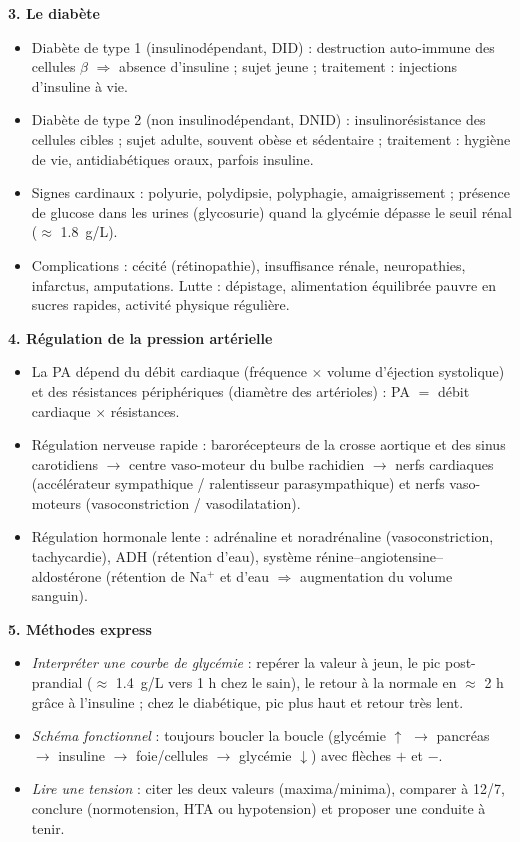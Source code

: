 \documentclass[11pt]{article}
\newcommand{\cle}[1]{{\popxbold\color{popdark}#1}}
\begin{document}
\begin{bilan}
\textbf{3. Le diabète}
\begin{itemize}
  \item \cle{Diabète de type 1} (insulinodépendant, DID) : destruction auto-immune des cellules $\beta$ $\Rightarrow$ absence d'insuline ; sujet jeune ; traitement : injections d'insuline à vie.
  \item \cle{Diabète de type 2} (non insulinodépendant, DNID) : \cle{insulinorésistance} des cellules cibles ; sujet adulte, souvent obèse et sédentaire ; traitement : hygiène de vie, antidiabétiques oraux, parfois insuline.
  \item Signes cardinaux : \cle{polyurie}, \cle{polydipsie}, \cle{polyphagie}, amaigrissement ; présence de glucose dans les urines (\cle{glycosurie}) quand la glycémie dépasse le seuil rénal ($\approx$ \SI{1,8}{g/L}).
  \item Complications : cécité (rétinopathie), insuffisance rénale, neuropathies, infarctus, amputations. Lutte : dépistage, alimentation équilibrée pauvre en sucres rapides, activité physique régulière.
\end{itemize}

\textbf{4. Régulation de la pression artérielle}
\begin{itemize}
  \item La PA dépend du \cle{débit cardiaque} (fréquence $\times$ volume d'éjection systolique) et des \cle{résistances périphériques} (diamètre des artérioles) : PA $=$ débit cardiaque $\times$ résistances.
  \item \cle{Régulation nerveuse rapide} : barorécepteurs de la crosse aortique et des sinus carotidiens $\rightarrow$ centre vaso-moteur du bulbe rachidien $\rightarrow$ nerfs cardiaques (accélérateur sympathique / ralentisseur parasympathique) et nerfs vaso-moteurs (vasoconstriction / vasodilatation).
  \item \cle{Régulation hormonale lente} : adrénaline et noradrénaline (vasoconstriction, tachycardie), ADH (rétention d'eau), système rénine--angiotensine--aldostérone (rétention de Na$^+$ et d'eau $\Rightarrow$ augmentation du volume sanguin).
\end{itemize}

\textbf{5. Méthodes express}
\begin{itemize}
  \item \emph{Interpréter une courbe de glycémie} : repérer la valeur à jeun, le pic post-prandial ($\approx$ \SI{1,4}{g/L} vers 1 h chez le sain), le retour à la normale en $\approx$ 2 h grâce à l'insuline ; chez le diabétique, pic plus haut et retour très lent.
  \item \emph{Schéma fonctionnel} : toujours boucler la boucle (glycémie $\uparrow$ $\rightarrow$ pancréas $\rightarrow$ insuline $\rightarrow$ foie/cellules $\rightarrow$ glycémie $\downarrow$) avec flèches $+$ et $-$.
  \item \emph{Lire une tension} : citer les deux valeurs (maxima/minima), comparer à 12/7, conclure (normotension, HTA ou hypotension) et proposer une conduite à tenir.
\end{itemize}
\end{bilan}
\end{document}
